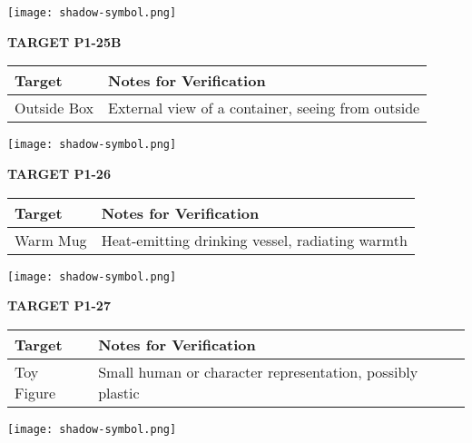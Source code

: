 \documentclass[10pt,twoside,final]{book} %
\makeatletter
\newcommand{\cleardoublepageWithSymbol}{%
  \clearpage %
  \if@twoside %
    \ifodd\c@page %
    \else %
      \thispagestyle{fancy} %
      \begingroup %
        \vspace*{0pt} %
        \vfill %
        \centering %
        \noindent 
        \texttt{[image: shadow-symbol.png]}
        \vfill %
      \endgroup
      \newpage    %
      \if@twocolumn\if@firstcolumn\else\hbox{}\newpage\fi\fi
    \fi
  \fi
}
\makeatother
\begin{document}
\cleardoublepageWithSymbol
\label{target:P1-25B}
\begin{center}
\Large\textbf{TARGET P1-25B}
\end{center}
\begin{mdframed}[backgroundcolor=white, linewidth=0.7pt, linecolor=rvprimary, shadow=true, shadowsize=1pt, shadowcolor=graydark!40, roundcorner=3pt]
\begin{tabular}{|p{3.5cm}|p{9cm}|}
\hline
\rowcolor{rvprimary!15}
\textbf{Target} & \textbf{Notes for Verification} \\
\hline
Outside Box & External view of a container, seeing from outside \\
\hline
\end{tabular}
\end{mdframed}


\cleardoublepageWithSymbol
\label{target:P1-26}
\begin{center}
\Large\textbf{TARGET P1-26}
\end{center}
\begin{mdframed}[backgroundcolor=white, linewidth=0.7pt, linecolor=rvprimary, shadow=true, shadowsize=1pt, shadowcolor=graydark!40, roundcorner=3pt]
\begin{tabular}{|p{3.5cm}|p{9cm}|}
\hline
\rowcolor{rvprimary!15}
\textbf{Target} & \textbf{Notes for Verification} \\
\hline
Warm Mug & Heat-emitting drinking vessel, radiating warmth \\
\hline
\end{tabular}
\end{mdframed}


\cleardoublepageWithSymbol
\label{target:P1-27}
\begin{center}
\Large\textbf{TARGET P1-27}
\end{center}
\begin{mdframed}[backgroundcolor=white, linewidth=0.7pt, linecolor=rvprimary, shadow=true, shadowsize=1pt, shadowcolor=graydark!40, roundcorner=3pt]
\begin{tabular}{|p{3.5cm}|p{9cm}|}
\hline
\rowcolor{rvprimary!15}
\textbf{Target} & \textbf{Notes for Verification} \\
\hline
Toy Figure & Small human or character representation, possibly plastic \\
\hline
\end{tabular}
\end{mdframed}

\cleardoublepageWithSymbol
\end{document}
